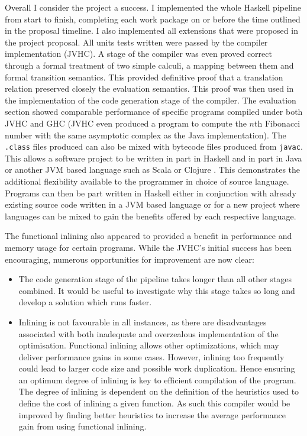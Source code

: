 \documentclass[float=false, crop=false]{standalone}
\begin{document}
Overall I consider the project a success. I implemented the whole Haskell
pipeline from start to finish, completing each work package on or
before the time outlined in the proposal timeline. I also implemented
all extensions that were proposed in the project proposal. 
All units tests written were passed by the compiler implementation (JVHC). 
A stage of the compiler was even proved correct through
a formal treatment of two simple calculi, a mapping between them
and formal transition semantics. This provided definitive proof that a translation
relation preserved closely the evaluation semantics. This proof was then 
used in the implementation of the code generation stage of the compiler.
The evaluation section showed comparable performance of specific programs
compiled under both JVHC and GHC (JVHC even produced a program to compute
the $n$th Fibonacci number with the same asymptotic complex as the Java
implementation). The \verb|.class| files produced can also be mixed with 
bytecode files produced from \verb|javac|. This allows a software project to
be written in part in Haskell and in part in Java or another JVM based language
such as Scala \cite{scala} or Clojure \cite{clojure}. This demonstrates the 
additional flexibility available to the programmer in choice of source language.
Programs can then be part written in Haskell either in conjunction with already 
existing source code written in a JVM based language or for a new project
where languages can be mixed to gain the benefits offered by each respective language.

The functional inlining also
appeared to provided a benefit in performance and memory usage for certain
programs. 
While the JVHC’s initial success has been encouraging, numerous opportunities for improvement are now clear:
\begin{itemize}

\item The code generation stage of the pipeline takes longer than all other stages 
combined. It would be useful to investigate why this stage takes so long 
and develop a solution which runs faster.

\item Inlining is not favourable in all instances, as there are disadvantages associated with both inadequate and overzealous implementation of the optimisation.  Functional inlining allows other optimizations, which may deliver performance gains in some cases. However, inlining too frequently could lead to larger code size and possible work duplication. Hence ensuring an optimum degree of inlining is key to efficient compilation of the program. The degree of inlining is dependent on the definition of the heuristics used to define the cost of inlining a given function. As such this compiler would be improved by finding better heuristics to increase the average performance gain from using functional inlining.
\end{itemize}
\end{document}
